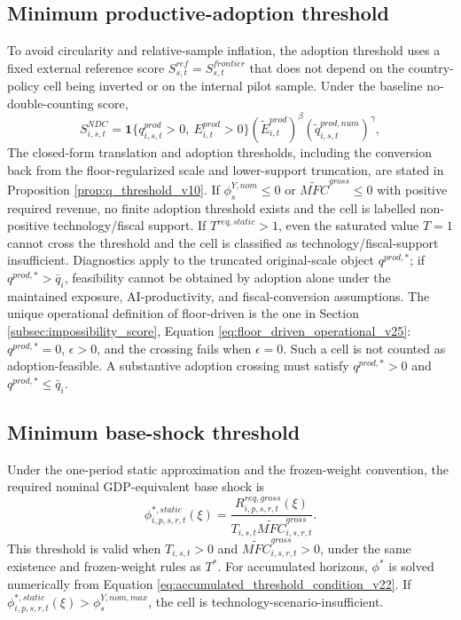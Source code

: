 \documentclass[11pt,a4paper]{article}
\begin{document}
\subsection{Minimum productive-adoption threshold}

To avoid circularity and relative-sample inflation, the adoption threshold uses a fixed external reference score $S^{ref}_{s,t}=S^{frontier}_{s,t}$ that does not depend on the country-policy cell being inverted or on the internal pilot sample. Under the baseline no-double-counting score,
\begin{equation}
    S^{NDC}_{i,s,t}=\mathbf{1}\{q^{prod}_{i,s,t}>0,\ E^{prod}_{i,t}>0\}(\tilde E^{prod}_{i,t})^\beta(\tilde q^{prod,num}_{i,s,t})^\gamma,
\end{equation}
The closed-form translation and adoption thresholds, including the conversion back from the floor-regularized scale and lower-support truncation, are stated in Proposition \ref{prop:q_threshold_v10}. If $\phi^{Y,nom}_s\leq0$ or $\widetilde{MFC}^{gross}\leq0$ with positive required revenue, no finite adoption threshold exists and the cell is labelled non-positive technology/fiscal support. If $T^{req,static}>1$, even the saturated value $T=1$ cannot cross the threshold and the cell is classified as technology/fiscal-support insufficient. Diagnostics apply to the truncated original-scale object $q^{prod,*}$; if $q^{prod,*}>\bar q_i$, feasibility cannot be obtained by adoption alone under the maintained exposure, AI-productivity, and fiscal-conversion assumptions. The unique operational definition of floor-driven is the one in Section \ref{subsec:impossibility_score}, Equation \eqref{eq:floor_driven_operational_v25}: $q^{prod,*}=0$, $\epsilon>0$, and the crossing fails when $\epsilon=0$. Such a cell is not counted as adoption-feasible. A substantive adoption crossing must satisfy $q^{prod,*}>0$ and $q^{prod,*}\leq\bar q_i$.

\subsection{Minimum base-shock threshold}

Under the one-period static approximation and the frozen-weight convention, the required nominal GDP-equivalent base shock is
\begin{equation}\label{eq:phi_star_static_app_v25}
    \phi^{*,static}_{i,p,s,r,t}(\xi)
    =\frac{R^{req,gross}_{i,p,s,r,t}(\xi)}
    {T_{i,s,t}\widetilde{MFC}^{gross}_{i,s,r,t}}.
\end{equation}
This threshold is valid when $T_{i,s,t}>0$ and $\widetilde{MFC}^{gross}_{i,s,r,t}>0$, under the same existence and frozen-weight rules as $T^*$. For accumulated horizons, $\phi^*$ is solved numerically from Equation \eqref{eq:accumulated_threshold_condition_v22}. If $\phi^{*,static}_{i,p,s,r,t}(\xi)>\phi^{Y,nom,max}_s$, the cell is technology-scenario-insufficient.
\end{document}
